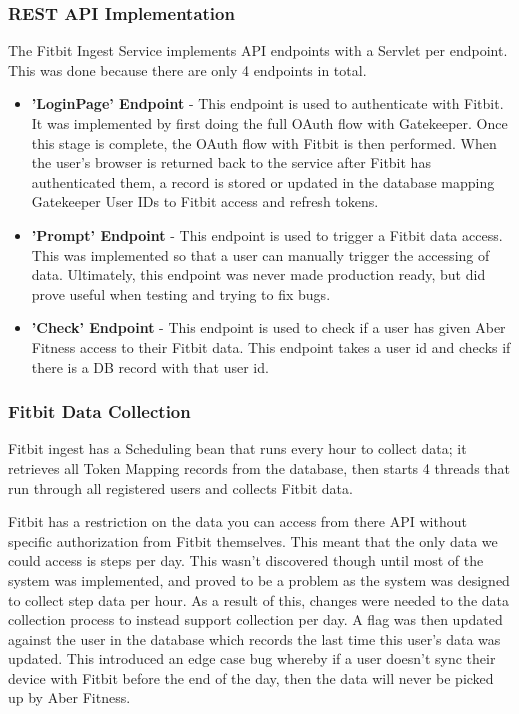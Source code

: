\subsubsection{REST API Implementation}

\par
The Fitbit Ingest Service implements API endpoints with a Servlet per endpoint. This was done because there are only 4 endpoints in total.

\begin{itemize}
	\item \textbf{'LoginPage' Endpoint} - This endpoint is used to authenticate with Fitbit. It was implemented by first doing the full OAuth flow with Gatekeeper. Once this stage is complete, the OAuth flow with Fitbit is then performed. When the user's browser is returned back to the service after Fitbit has authenticated them, a record is stored or updated in the database mapping Gatekeeper User IDs to Fitbit access and refresh tokens.

	\item \textbf{'Prompt' Endpoint} - This endpoint is used to trigger a Fitbit data access. This was implemented so that a user can manually trigger the accessing of data. Ultimately, this endpoint was never made production ready, but did prove useful when testing and trying to fix bugs.

	\item \textbf{'Check' Endpoint} - This endpoint is used to check if a user has given Aber Fitness access to their Fitbit data. This endpoint takes a user id and checks if there is a DB record with that user id.
\end{itemize}

\subsubsection{Fitbit Data Collection}

\par
Fitbit ingest has a Scheduling bean that runs every hour to collect data; it retrieves all Token Mapping records from the database, then starts 4 threads that run through all registered users and collects Fitbit data.

\par
Fitbit has a restriction on the data you can access from there API without specific authorization from Fitbit themselves. This meant that the only data we could access is steps per day. This wasn't discovered though until most of the system was implemented, and proved to be a problem as the system was designed to collect step data per hour. As a result of this, changes were needed to the data collection process to instead support collection per day. A flag was then updated against the user in the database which records the last time this user's data was updated. This introduced an edge case bug whereby if a user doesn't sync their device with Fitbit before the end of the day, then the data will never be picked up by Aber Fitness.

